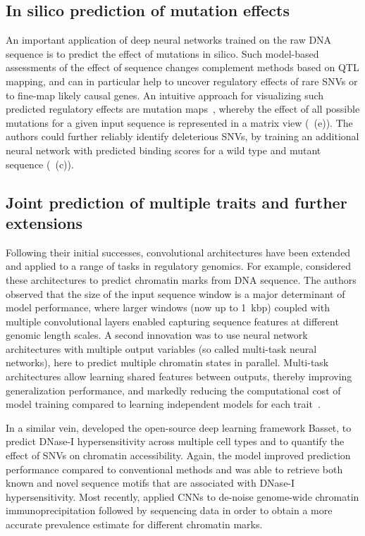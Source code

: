\subsection{In silico prediction of mutation effects}

An important application of deep neural networks trained on the raw DNA sequence is to predict the effect of mutations in silico. Such model-based assessments of the effect of sequence changes complement methods based on QTL mapping, and can in particular help to uncover regulatory effects of rare SNVs or to fine-map likely causal genes. An intuitive approach for visualizing such predicted regulatory effects are mutation maps~\citep{alipanahi_predicting_2015}, whereby the effect of all possible mutations for a given input sequence is represented in a matrix view (~(e)). The authors could further reliably identify deleterious SNVs, by training an additional neural network with predicted binding scores for a wild type and mutant sequence (~(c)).


\subsection{Joint prediction of multiple traits and further extensions}

Following their initial successes, convolutional architectures have been extended and applied to a range of tasks in regulatory genomics. For example, \citet{zhou_predicting_2015} considered these architectures to predict chromatin marks from DNA sequence. The authors observed that the size of the input sequence window is a major determinant of model performance, where larger windows (now up to 1~kbp) coupled with multiple  convolutional layers enabled capturing sequence features at different genomic length scales. A second innovation was to use neural network architectures with multiple output variables (so called multi-task neural networks), here to predict multiple chromatin states in parallel. Multi-task architectures allow learning shared features between outputs, thereby improving generalization performance, and markedly reducing the computational cost of model training compared to learning independent models for each trait~\citep{dahl_multi-task_2014}.

In a similar vein, \citet{kelley_basset:_2016} developed the open-source deep learning framework Basset, to predict DNase-I hypersensitivity across multiple cell types and to quantify the effect of SNVs on chromatin accessibility. Again, the model improved prediction performance compared to conventional methods and was able to retrieve both known and novel sequence motifs that are associated with DNase-I hypersensitivity. Most recently, \citet{koh_denoising_2017} applied CNNs to de-noise genome-wide chromatin immunoprecipitation followed by sequencing data in order to obtain a more accurate prevalence estimate for different chromatin marks.

